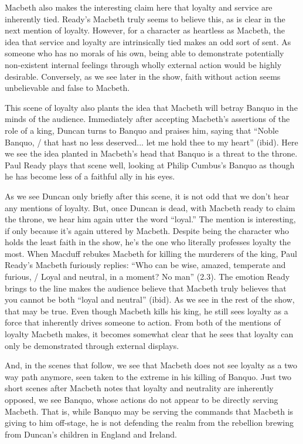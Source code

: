 \documentclass[12pt]{article}[titlepage]
\newcommand{\say}[1]{``#1''}
\newcommand{\1}{\={a}}
\newcommand{\2}{\={e}}
\newcommand{\3}{\={\i}}
\newcommand{\4}{\=o}
\newcommand{\5}{\=u}
\newcommand{\6}{\={A}}
\renewcommand{\,}{\textsuperscript{,}}
\begin{document}
Macbeth also makes the interesting claim here that loyalty and service are inherently tied.
Ready's Macbeth truly seems to believe this, as is clear in the next mention of loyalty.
However, for a character as heartless as Macbeth, the idea that service and loyalty are intrinsically tied makes an odd sort of sent.
As someone who has no morals of his own, being able to demonstrate potentially non-existent internal feelings through wholly external action would be highly desirable.
Conversely, as we see later in the show, faith without action seems unbelievable and false to Macbeth.

This scene of loyalty also plants the idea that Macbeth will betray Banquo in the minds of the audience.
Immediately after accepting Macbeth's assertions of the role of a king, Duncan turns to Banquo and praises him, saying that \say{Noble Banquo, / that hast no less deserved... let me hold thee to my heart} (ibid).
Here we see the idea planted in Macbeth's head that Banquo is a threat to the throne.
Paul Ready plays that scene well, looking at Philip Cumbus's Banquo as though he has become less of a faithful ally in his eyes.

As we see Duncan only briefly after this scene, it is not odd that we don't hear any mentions of loyalty.
But, once Duncan is dead, with Macbeth ready to claim the throne, we hear him again utter the word \say{loyal.}
The mention is interesting, if only because it's again uttered by Macbeth.
Despite being the character who holds the least faith in the show, he's the one who literally professes loyalty the most.
When Macduff rebukes Macbeth for killing the murderers of the king, Paul Ready's Macbeth furiously replies: \say{Who can be wise, amazed, temperate and furious, / Loyal and neutral, in a moment? No man} (2.3).
The emotion Ready brings to the line makes the audience believe that Macbeth truly believes that you cannot be both \say{loyal and neutral} (ibid).
As we see in the rest of the show, that may be true.
Even though Macbeth kills his king, he still sees loyalty as a force that inherently drives someone to action.
From both of the mentions of loyalty Macbeth makes, it becomes somewhat clear that he sees that loyalty can only be demonstrated through external displays.

And, in the scenes that follow, we see that Macbeth does not see loyalty as a two way path anymore, seen taken to the extreme in his killing of Banquo.
Just two short scenes after Macbeth notes that loyalty and neutrality are inherently opposed, we see Banquo, whose actions do not appear to be directly serving Macbeth.
That is, while Banquo may be serving the commands that Macbeth is giving to him off-stage, he is not defending the realm from the rebellion brewing from Duncan's children in England and Ireland.
\end{document}
